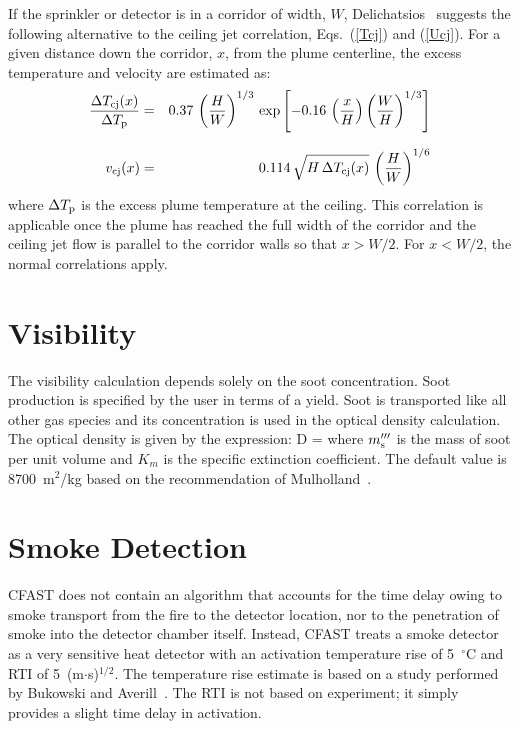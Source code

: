 \documentclass[12pt]{book}
\begin{document}
If the sprinkler or detector is in a corridor of width, $W$, Delichatsios~\cite{Alpert:SFPE} suggests the following alternative to the ceiling jet correlation, Eqs.~(\ref{Tcj}) and (\ref{Ucj}). For a given distance down the corridor, $x$, from the plume centerline, the excess temperature and velocity are estimated as:
\begin{eqnarray}
   \frac{\Delta T_{\rm cj}(x)}{\Delta T_{\rm p}} &=& 0.37 \, \left( \frac{H}{W} \right)^{1/3} \, \exp \left[ -0.16 \, \left( \frac{x}{H} \right) \left( \frac{W}{H} \right)^{1/3} \right]  \\[0.1in]
   v_{\rm cj}(x) &=& 0.114 \, \sqrt{H \, \Delta T_{\rm cj}(x) } \, \left( \frac{H}{W} \right)^{1/6}
\end{eqnarray}
where $\Delta T_{\rm p}$ is the excess plume temperature at the ceiling. This correlation is applicable once the plume has reached the full width of the corridor and the ceiling jet flow is parallel to the corridor walls so that $x>W/2$. For $x<W/2$, the normal correlations apply.


\section{Visibility}
\label{Visibility}

The visibility calculation depends solely on the soot concentration. Soot production is specified by the user in terms of a yield. Soot is transported like all other gas species and its concentration is used in the optical density calculation. The optical density is given by the expression:
\be
   D = 
\ee
where $m_{\rm s}'''$ is the mass of soot per unit volume and $K_m$ is the specific extinction coefficient. The default value is 8700~m$^2$/kg based on the recommendation of Mulholland~\cite{Mulholland:SFPE}.

\section{Smoke Detection}

CFAST does not contain an algorithm that accounts for the time delay owing to smoke transport from the fire to the detector location, nor to the penetration of smoke into the detector chamber itself. Instead, CFAST treats a smoke detector as a very sensitive heat detector with an activation temperature rise of 5~$^\circ$C and RTI of 5~(m$\cdot$s)$^{1/2}$. The temperature rise estimate is based on a study performed by Bukowski and Averill~\cite{Bukowski:1998}. The RTI is not based on experiment; it simply provides a slight time delay in activation.
\end{document}
